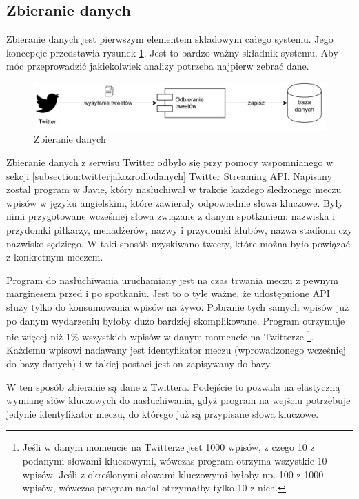 \clearpage
\subsection{Zbieranie danych}
\label{subsection:zbieraniedanych}
Zbieranie danych jest pierwszym elementem składowym całego systemu.
Jego koncepcje przedstawia rysunek \ref{image:zbieranie-danych}.
Jest to bardzo ważny składnik systemu. Aby móc przeprowadzić jakiekolwiek
analizy potrzeba najpierw zebrać dane.

\begin{figure}[ht!]
\centering
\includegraphics[width=160mm]{img/zbieranie-danych.png}
\caption{Zbieranie danych}
\label{image:zbieranie-danych}
\end{figure}


Zbieranie danych z serwisu Twitter odbyło się przy pomocy wspomnianego w sekcji
\ref{subsection:twitterjakozrodlodanych} Twitter Streaming API. Napisany został
program w Javie, który nasłuchiwał w trakcie każdego śledzonego meczu wpisów w
języku angielskim, które zawierały odpowiednie słowa kluczowe. Były nimi
przygotowane wcześniej słowa związane z danym spotkaniem: nazwiska i przydomki
piłkarzy, menadżerów, nazwy i przydomki klubów, nazwa stadionu czy nazwisko
sędziego. W taki sposób uzyskiwano tweety, które można było powiązać z
konkretnym meczem.

Program do nasłuchiwania uruchamiany jest na czas trwania meczu z pewnym
marginesem przed i po spotkaniu. Jest to o tyle ważne, że udostępnione API służy
tylko do konsumowania wpisów na żywo. Pobranie tych samych wpisów już po danym
wydarzeniu byłoby dużo bardziej skomplikowane. Program otrzymuje nie więcej niż
1\% wszystkich wpisów w danym momencie na Twitterze \footnote{Jeśli w danym
momencie na Twitterze jest 1000 wpisów, z czego 10 z podanymi słowami
kluczowymi, wówczas program otrzyma wszystkie 10 wpisów. Jeśli z określonymi
słowami kluczowymi byłoby np. 100 z 1000 wpisów, wówczas program nadal
otrzymałby tylko 10 z nich.}. Każdemu wpisowi nadawany jest identyfikator meczu (wprowadzonego
wcześniej do bazy danych) i w takiej postaci jest on zapisywany do bazy.

W ten sposób zbieranie są dane z Twittera. Podejście to pozwala na elastyczną
wymianę słów kluczowych do nasłuchiwania, gdyż program na wejściu potrzebuje
jedynie identyfikator meczu, do którego już są przypisane słowa kluczowe.





